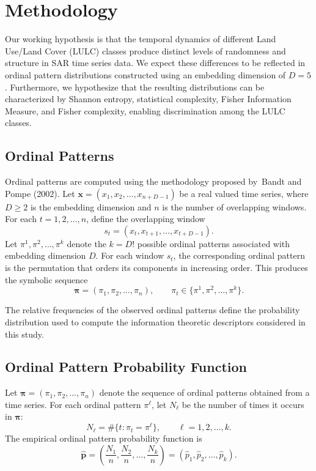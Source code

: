\documentclass[
  conference]{IEEEtran}
\begin{document}
\section{Methodology}\label{methodology}

Our working hypothesis is that the temporal dynamics of different Land
Use/Land Cover (LULC) classes produce distinct levels of randomness and
structure in SAR time series data. We expect these differences to be
reflected in ordinal pattern distributions constructed using an
embedding dimension of \(D=5\). Furthermore, we hypothesize that the
resulting distributions can be characterized by Shannon entropy,
statistical complexity, Fisher Information Measure, and Fisher
complexity, enabling discrimination among the LULC classes.

\subsection{Ordinal Patterns}\label{ordinal-patterns}

Ordinal patterns are computed using the methodology proposed by~Bandt
and Pompe (2002). Let \(\mathbf{x} = (x_1, x_2, \dots, x_{n+D-1})\) be a
real valued time series, where \(D \ge 2\) is the embedding dimension
and \(n\) is the number of overlapping windows. For each
\(t = 1,2,\dots,n\), define the overlapping window \[
s_t = (x_t, x_{t+1}, \dots, x_{t+D-1}).
\] Let \(\pi^1, \pi^2, \dots, \pi^k\) denote the \(k = D!\) possible
ordinal patterns associated with embedding dimension \(D\). For each
window \(s_t\), the corresponding ordinal pattern is the permutation
that orders its components in increasing order. This produces the
symbolic sequence \[
\boldsymbol{\pi} = (\pi_1, \pi_2, \dots, \pi_n), \qquad \pi_t \in \{\pi^1,\pi^2,\dots,\pi^k\}.
\]

The relative frequencies of the observed ordinal patterns define the
probability distribution used to compute the information theoretic
descriptors considered in this study.

\subsection{Ordinal Pattern Probability
Function}\label{ordinal-pattern-probability-function}

Let \(\boldsymbol{\pi} = (\pi_1, \pi_2, \dots, \pi_n)\) denote the
sequence of ordinal patterns obtained from a time series. For each
ordinal pattern \(\pi^{\ell}\), let \(N_\ell\) be the number of times it
occurs in \(\boldsymbol{\pi}\): \[
N_\ell = \#\{t : \pi_t = \pi^{\ell}\}, \qquad \ell = 1,2,\dots,k.
\] The empirical ordinal pattern probability function is \[
\widehat{\mathbf{p}} = \left(\frac{N_1}{n}, \frac{N_2}{n}, \dots, \frac{N_k}{n}\right) = (\widehat{p}_{1}, \widehat{p}_{2}, \dots, \widehat{p}_{k}).
\]
\end{document}
